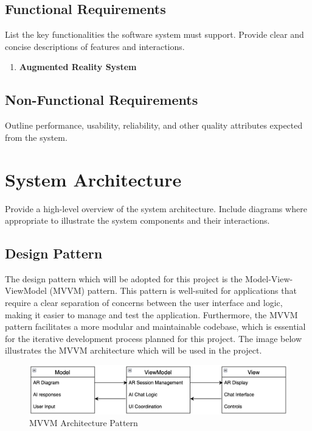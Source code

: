 \documentclass[12pt]{article}
\begin{document}
    \subsection{Functional Requirements}
    List the key functionalities the software system must support. Provide clear and concise descriptions of features and interactions.

    \begin{enumerate}
        \item \textbf{Augmented Reality System}
    \end{enumerate}

    \subsection{Non-Functional Requirements}
    Outline performance, usability, reliability, and other quality attributes expected from the system.

\section{System Architecture}
Provide a high-level overview of the system architecture. Include diagrams where appropriate to illustrate the system components and their interactions.

    \subsection{Design Pattern}

    The design pattern which will be adopted for this project is the Model-View-ViewModel (MVVM) pattern. This pattern is well-suited for applications that require a clear separation
    of concerns between the user interface and logic, making it easier to manage and test the application. Furthermore, the MVVM pattern facilitates a more modular and maintainable
    codebase, which is essential for the iterative development process planned for this project. The image below illustrates the MVVM architecture which will be used in the project.

    \begin{figure}[H]
        \centering
        \includegraphics[width=\textwidth]{img/Pattern.png}
        \caption{MVVM Architecture Pattern}
        \label{fig:Pattern}
    \end{figure}
\end{document}
